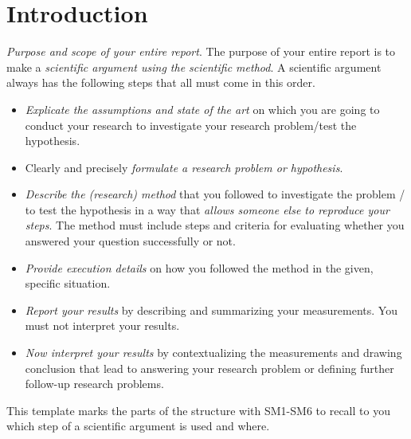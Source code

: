 \documentclass[../thesis-example-en]{subfiles}
\begin{document}
\chapter{Introduction}\label{sec:introduction}


\emph{Purpose and scope of your entire report}.
The purpose of your entire report is to make a \emph{scientific argument using the scientific method}.
A scientific argument always has the following steps that all must come in this order.
%
\begin{itemize}
  \item[SM1] \emph{Explicate the assumptions and state of the art} on which you are going to conduct your research to investigate your research problem/test the hypothesis.
  \item[SM2] Clearly and precisely \emph{formulate a research problem or hypothesis}.
  \item[SM3] \emph{Describe the (research) method} that you followed to investigate the problem / to test the hypothesis in a way that \emph{allows someone else to reproduce your steps}.
        The method must include steps and criteria for evaluating whether you answered your question successfully or not.
  \item[SM4] \emph{Provide execution details} on how you followed the method in the given, specific situation.
  \item[SM5] \emph{Report your results} by describing and summarizing your measurements.
        You must not interpret your results.
  \item[SM6] \emph{Now interpret your results} by contextualizing the measurements and drawing conclusion that lead to answering your research problem or defining further follow-up research problems.
\end{itemize}
%
This template marks the parts of the structure with SM1-SM6 to recall to you which step of a scientific argument is used and where.
\end{document}
